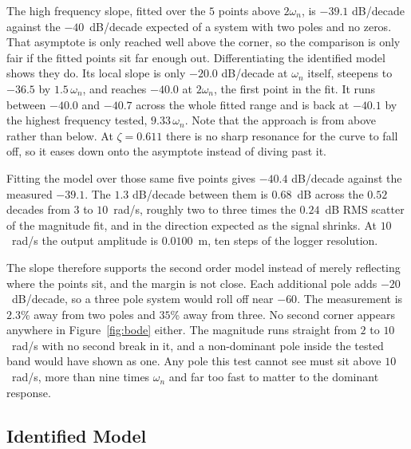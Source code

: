 The high frequency slope, fitted over the $5$ points above $2\omega_n$, is $-39.1$ dB/decade
against the $-40$~dB/decade expected of a system with two poles and no zeros. That asymptote is
only reached well above the corner, so the comparison is only fair if the fitted points sit far
enough out. Differentiating the identified model shows they do. Its local slope is only $-20.0$
dB/decade at $\omega_n$ itself, steepens to $-36.5$ by $1.5\,\omega_n$, and reaches $-40.0$ at
$2\omega_n$, the first point in the fit. It runs between $-40.0$ and $-40.7$ across the whole
fitted range and is back at $-40.1$ by the highest frequency tested, $9.33\,\omega_n$. Note
that the approach is from above rather than below. At $\zeta = 0.611$ there is no sharp
resonance for the curve to fall off, so it eases down onto the asymptote instead of diving past
it.

Fitting the model over those same five points gives $-40.4$ dB/decade against the measured
$-39.1$. The $1.3$ dB/decade between them is $0.68$~dB across the $0.52$ decades from $3$ to
$10$~rad/s, roughly two to three times the $0.24$~dB RMS scatter of the magnitude fit, and
in the direction expected as the signal shrinks. At $10$~rad/s the output amplitude is
$0.0100$~m, ten steps of the logger resolution.

The slope therefore supports the second order model instead of merely reflecting where the
points sit, and the margin is not close. Each additional pole adds $-20$~dB/decade, so a
three pole system would roll off near $-60$. The measurement is $2.3$\% away from two poles
and $35$\% away from three. No second corner appears anywhere in Figure~\ref{fig:bode}
either. The magnitude runs straight from $2$ to $10$~rad/s with no second break in it, and a
non-dominant pole inside the tested band would have shown as one. Any pole this test cannot
see must sit above $10$~rad/s, more than nine times $\omega_n$ and far too fast to matter to
the dominant response.

\subsection{Identified Model}

